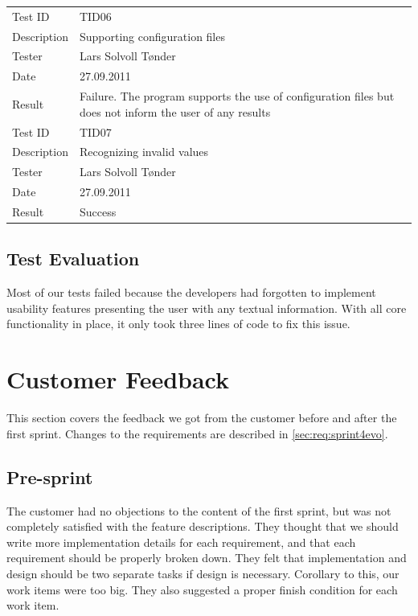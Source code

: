\begin{table}[!htb]
{\begin{tabularx}{\textwidth}{l X}
	\midrule
	Test ID & TID06 \\
	Description &  Supporting configuration files  \\
	Tester & Lars Solvoll Tønder \\
	Date & 27.09.2011 \\
	Result & Failure. The program supports the use of configuration files but does not inform the user of any results\\
	\midrule
	Test ID & TID07 \\
	Description &  Recognizing invalid values  \\
	Tester & Lars Solvoll Tønder \\
	Date & 27.09.2011 \\
	Result & Success\\
	\bottomrule
\end{tabularx}}
\end{table}

\subsection{Test Evaluation}
Most of our tests failed because the developers had forgotten to implement
usability features presenting the user with any textual information. With all
core functionality in place, it only took three lines of code to fix this issue.


\section{Customer Feedback}
\label{sec:sp1:feedback}
This section covers the feedback we got from the customer before and after the first sprint.
Changes to the requirements are described in \autoref{sec:req:sprint4evo}.

\subsection{Pre-sprint}
The customer had no objections to the content of the first sprint, but was not
completely satisfied with the feature descriptions. They thought that we should
write more implementation details for each requirement, and that each
requirement should be properly broken down. They felt that
implementation and design should be two separate tasks if design is necessary.
Corollary to this, our work items were too big. They also suggested a proper
finish condition for each work item.


